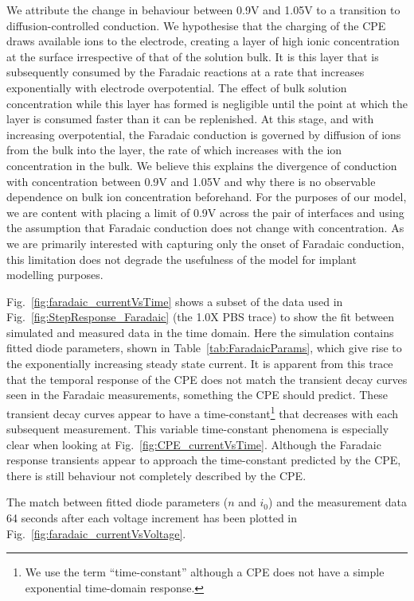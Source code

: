 \documentclass[journal, a4paper]{IEEEtran}
\begin{document}
We attribute the change in behaviour between 0.9\thinspace V and 1.05\thinspace V to a transition to diffusion-controlled conduction.
We hypothesise that the charging of the CPE draws available ions to the electrode, creating a layer of high ionic concentration at the surface irrespective of that of the solution bulk. It is this layer that is subsequently consumed by the Faradaic reactions at a {\color{blue} rate that increases exponentially with} electrode overpotential.  The effect of bulk solution concentration while this layer has formed is negligible until the point at which the layer is consumed faster than it can be replenished. At this stage, and with increasing overpotential, the Faradaic conduction is governed by diffusion of ions from the bulk into the layer, the rate of which increases with the ion concentration in the bulk. We believe this explains the divergence of conduction with concentration between 0.9\thinspace V and 1.05\thinspace V and why there is no observable dependence on bulk ion concentration beforehand.
For the purposes of our model, we are content with placing a limit of 0.9\thinspace V across the pair of interfaces and using the assumption that Faradaic conduction does not change with concentration. {\color{blue} As we are primarily interested with capturing only the onset of Faradaic conduction, this limitation does not degrade the usefulness of the model for implant modelling purposes.}


    Fig.~\ref{fig:faradaic_currentVsTime} shows a subset of the data used in Fig.~\ref{fig:StepResponse_Faradaic} (the 1.0X PBS trace) to show the fit between simulated and measured data in the time domain. Here the simulation contains fitted diode parameters, shown in Table~\ref{tab:FaradaicParams}, which give rise to the exponentially increasing steady state current.
It is apparent from this trace that the temporal response of the CPE does not match the transient decay curves seen in the Faradaic measurements, something the CPE should predict. These transient decay curves appear to have a time-constant\footnote{We use the term ``time-constant'' although a CPE does not have a simple exponential time-domain response.} that decreases with each subsequent measurement. This variable time-constant phenomena is especially clear when looking at Fig.~\ref{fig:CPE_currentVsTime}. Although the Faradaic response transients appear to approach the time-constant predicted by the CPE, there is still behaviour not completely described by the CPE.

The match between fitted diode parameters ($n$ and $i_{0}$) and the measurement data 64 seconds after each voltage increment has been plotted in Fig.~\ref{fig:faradaic_currentVsVoltage}.
\end{document}
